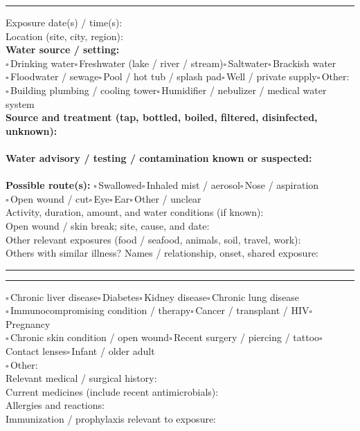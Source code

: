 \documentclass[10pt,a4paper]{article}
\newcommand{\boxx}{\ensuremath{\square}}
\newcommand{\checkitem}[1]{\boxx\,#1\quad}
\newcommand{\linefield}[2]{#1\ \underline{\hspace{#2}}}
\newcommand{\writearea}[1]{\vspace{1pt}\par\noindent\rule{\linewidth}{0.35pt}\par\vspace{#1}}
\newcommand{\sectionbar}[1]{\vspace{3pt}{\large\bfseries #1}\par\vspace{1pt}\hrule\vspace{3pt}}
\begin{document}
\sectionbar{3. Water and environmental exposure history}
\linefield{Exposure date(s) / time(s):}{5.2cm}\\
\linefield{Location (site, city, region):}{10.0cm}\\
\textbf{Water source / setting:}\\
\checkitem{Drinking water}\checkitem{Freshwater (lake / river / stream)}\checkitem{Saltwater}\checkitem{Brackish water}\\
\checkitem{Floodwater / sewage}\checkitem{Pool / hot tub / splash pad}\checkitem{Well / private supply}\checkitem{Other:}\underline{\hspace{2.0cm}}\\
\checkitem{Building plumbing / cooling tower}\checkitem{Humidifier / nebulizer / medical water system}\\
\textbf{Source and treatment (tap, bottled, boiled, filtered, disinfected, unknown):}\\
\underline{\hspace{15cm}}\\
\textbf{Water advisory / testing / contamination known or suspected:}\\
\underline{\hspace{15cm}}\\
\textbf{Possible route(s):} \checkitem{Swallowed}\checkitem{Inhaled mist / aerosol}\checkitem{Nose / aspiration}\\
\checkitem{Open wound / cut}\checkitem{Eye}\checkitem{Ear}\checkitem{Other / unclear}\\
\linefield{Activity, duration, amount, and water conditions (if known):}{6.3cm}\\
\linefield{Open wound / skin break; site, cause, and date:}{7.3cm}\\
\linefield{Other relevant exposures (food / seafood, animals, soil, travel, work):}{5.0cm}\\
\linefield{Others with similar illness? Names / relationship, onset, shared exposure:}{4.0cm}
\writearea{5mm}

\newpage
\sectionbar{4. Relevant health history and risk factors}
\checkitem{Chronic liver disease}\checkitem{Diabetes}\checkitem{Kidney disease}\checkitem{Chronic lung disease}\\
\checkitem{Immunocompromising condition / therapy}\checkitem{Cancer / transplant / HIV}\checkitem{Pregnancy}\\
\checkitem{Chronic skin condition / open wound}\checkitem{Recent surgery / piercing / tattoo}\checkitem{Contact lenses}\checkitem{Infant / older adult}\\
\checkitem{Other:}\underline{\hspace{3.0cm}}\\
\linefield{Relevant medical / surgical history:}{8.0cm}\\
\linefield{Current medicines (include recent antimicrobials):}{7.0cm}\\
\linefield{Allergies and reactions:}{5.5cm}\\
\linefield{Immunization / prophylaxis relevant to exposure:}{4.7cm}
\end{document}
